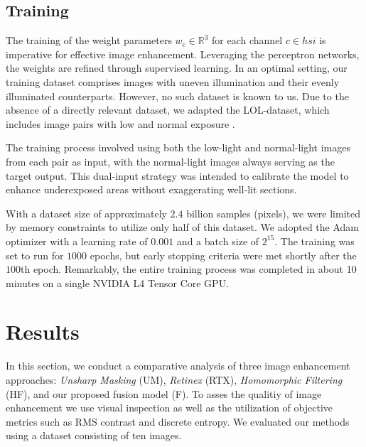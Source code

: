 \documentclass[sigconf]{acmart}
\begin{document}
\begin{mdframed}[backgroundcolor=backcolour,leftmargin=0cm,hidealllines=true,innerleftmargin=0cm,innerrightmargin=0cm,innertopmargin=0cm,innerbottommargin=-0.65cm]

\end{mdframed}

\subsection{Training}\label{sec:training}
The training of the weight parameters $w_{c} \in \mathbb{R}^3$ for each channel $c \in {hsi}$ is imperative for effective image enhancement. Leveraging the perceptron networks, the weights are refined through supervised learning. In an optimal setting, our training dataset comprises images with uneven illumination and their evenly illuminated counterparts. However, no such dataset is known to us. Due to the absence of a directly relevant dataset, we adapted the LOL-dataset, which includes image pairs with low and normal exposure \cite{wei2018deep}.

The training process involved using both the low-light and normal-light images from each pair as input, with the normal-light images always serving as the target output. This dual-input strategy was intended to calibrate the model to enhance underexposed areas without exaggerating well-lit sections.

With a dataset size of approximately $2.4$ billion samples (pixels), we were limited by memory constraints to utilize only half of this dataset. We adopted the Adam optimizer with a learning rate of $0.001$ and a batch size of $2^{15}$. The training was set to run for $1000$ epochs, but early stopping criteria were met shortly after the $100$th epoch. Remarkably, the entire training process was completed in about 10 minutes on a single NVIDIA L4 Tensor Core GPU.

\section{Results}\label{sec:results}
In this section, we conduct a comparative analysis of three image enhancement approaches: \textit{Unsharp Masking} (UM), \textit{Retinex} (RTX), \textit{Homomorphic Filtering} (HF), and our proposed fusion model (F). To asses the qualitiy of image enhancement we use visual inspection as well as the utilization of objective metrics such as RMS contrast and discrete entropy. We evaluated our methods using a dataset consisting of ten images.
\end{document}
